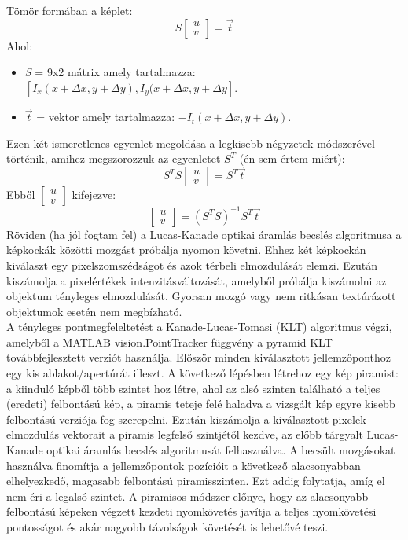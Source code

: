 \documentclass[12pt]{report}
\begin{document}
\begin{enumerate}
                    Tömör formában a képlet:
                    \[S\begin{bmatrix} u \\ v \end{bmatrix} = \overset{\rightarrow}{t}\]
                    Ahol:
                    \begin{itemize}
                        \item \textit{S} = 9x2 mátrix amely tartalmazza: $[I_x(x + \Delta x, y + \Delta y),  I_y(x + \Delta x, y + \Delta y]$.
                        \item \textit{$\overset{\rightarrow}{t}$} = vektor amely tartalmazza: $-I_t(x + \Delta x, y + \Delta y)$.
                    \end{itemize}
                    Ezen két ismeretlenes egyenlet megoldása a legkisebb négyzetek módszerével történik, amihez megszorozzuk az egyenletet $S^{T}$ (én sem értem miért):
                    \[S^{T}S\begin{bmatrix}u \\ v\end{bmatrix} = S^{T}\overset{\rightarrow}{t}\]
                    Ebből $\begin{bmatrix}u \\ v\end{bmatrix}$ kifejezve:
                    \[\begin{bmatrix}u \\ v\end{bmatrix} = (S^{T}S)^{-1}S^{T}\overset{\rightarrow}{t}\]
                    Röviden (ha jól fogtam fel) a Lucas-Kanade optikai áramlás becslés algoritmusa a képkockák közötti mozgást próbálja nyomon követni. Ehhez két képkockán kiválaszt egy pixelszomszédságot és azok térbeli elmozdulását elemzi. Ezután kiszámolja a pixelértékek intenzitásváltozását, amelyből próbálja kiszámolni az objektum tényleges elmozdulását. Gyorsan mozgó vagy nem ritkásan textúrázott objektumok esetén nem megbízható.\\
                    A tényleges pontmegfeleltetést a Kanade-Lucas-Tomasi (KLT) algoritmus végzi, amelyből a MATLAB vision.PointTracker függvény a pyramid KLT továbbfejlesztett verziót használja. Először minden kiválasztott jellemzőponthoz egy kis ablakot/apertúrát illeszt. A következő lépésben létrehoz egy kép piramist: a kiinduló képből több szintet hoz létre, ahol az alsó szinten található a teljes (eredeti) felbontású kép, a piramis teteje felé haladva a vizsgált kép egyre kisebb felbontású verziója fog szerepelni. Ezután kiszámolja a kiválasztott pixelek elmozdulás vektorait a piramis legfelső szintjétől kezdve, az előbb tárgyalt Lucas-Kanade optikai áramlás becslés algoritmusát felhasználva. A becsült mozgásokat használva finomítja a jellemzőpontok pozícióit a következő alacsonyabban elhelyezkedő, magasabb felbontású piramisszinten. Ezt addig folytatja, amíg el nem éri a legalsó szintet. A piramisos módszer előnye, hogy az alacsonyabb felbontású képeken végzett kezdeti nyomkövetés javítja a teljes nyomkövetési pontosságot és akár nagyobb távolságok követését is lehetővé teszi.\\

\end{enumerate}
\end{document}
